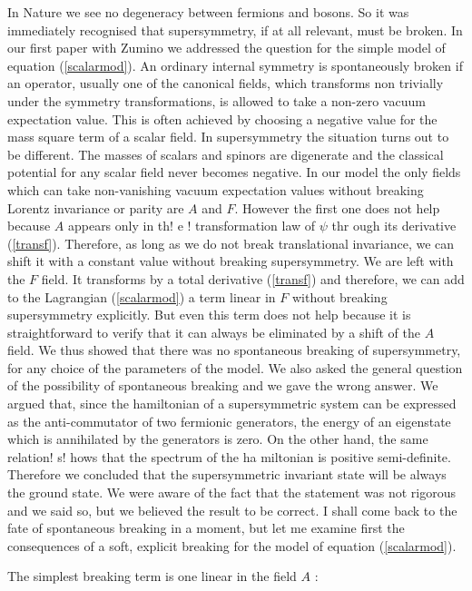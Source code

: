 \documentclass[a4paper,11pt]{article}
\begin{document}
In Nature we see no degeneracy between fermions and bosons. So it was immediately recognised that supersymmetry, if at all relevant, must be broken. In our first paper with Zumino \cite{IZ} we addressed the question for the simple model of equation (\ref{scalarmod}). An ordinary internal symmetry is spontaneously broken if an operator, usually one of the canonical fields, which transforms non trivially under the symmetry transformations, is allowed to take a non-zero vacuum expectation value. This is often  achieved by choosing a negative value for the mass square term of a scalar field.  In supersymmetry the situation turns out to be different. The masses of scalars and spinors are digenerate and the classical potential for any scalar field never becomes negative. In our model the only fields which can take non-vanishing vacuum expectation values without breaking Lorentz invariance or parity are $A$ and $F$. However the first one does not help because $A$ appears only in th!
e !
transformation law of $\psi$ thr
ough its derivative (\ref{transf}). Therefore, as long as we do not break translational invariance, we can shift it with a constant value without breaking supersymmetry. We are left with the $F$ field. It transforms by a total derivative (\ref{transf}) and therefore,  we can add to the Lagrangian (\ref{scalarmod}) a term linear in $F$ without breaking supersymmetry explicitly. But even this term does not help because it is straightforward to verify that it can always be eliminated by a shift of the $A$ field. We thus showed that there was no spontaneous breaking of supersymmetry, for any choice of the parameters of the model. We also asked the general question of the  possibility of spontaneous breaking and we gave the wrong answer. We argued that, since the hamiltonian of a supersymmetric system can be expressed as the anti-commutator of two fermionic generators, the energy of an eigenstate which is annihilated by the generators is zero. On the other hand, the same relation!
 s!
hows that the spectrum of the ha
miltonian is positive semi-definite. Therefore we concluded that the supersymmetric invariant state will be always the ground state. We were aware of the fact that the statement was not rigorous and we said so, but we believed the result to be correct. I shall come back to the fate of spontaneous breaking in a moment, but let me examine first the consequences of a soft, explicit breaking for the model of equation (\ref{scalarmod}).



The simplest breaking term is one linear in the field $A$ \cite{IZ}:
\end{document}

